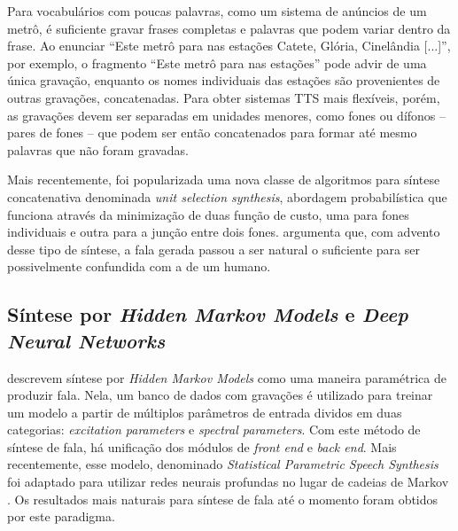 Para vocabulários com poucas palavras, como um sistema de anúncios de um metrô, é
suficiente gravar frases completas e palavras que podem variar dentro da frase.
Ao enunciar ``Este metrô para nas estações Catete, Glória, Cinelândia [...]'',
por exemplo, o fragmento ``Este metrô para nas estações'' pode advir de uma
única gravação, enquanto os nomes individuais das estações são provenientes de
outras gravações, concatenadas. Para obter sistemas TTS mais flexíveis, porém,
as gravações devem ser separadas em unidades menores, como fones ou dífonos --
 pares de fones -- que podem ser então concatenados para formar até mesmo
palavras que não foram gravadas.

Mais recentemente, foi popularizada uma nova classe de algoritmos para
síntese concatenativa denominada \emph{unit selection synthesis}, abordagem
probabilística que funciona através da minimização de duas função de custo, uma
para fones individuais e outra para a junção entre dois fones.
 argumenta que, com advento desse tipo de síntese, a fala
gerada passou a ser natural o suficiente para ser possivelmente confundida com a de um humano.

\subsection{Síntese por \emph{Hidden Markov Models} e \emph{Deep Neural Networks}}
\label{hmmsynthesis}
 descrevem síntese por \emph{Hidden Markov Models} como uma
maneira paramétrica de produzir fala. Nela, um banco de dados com gravações é
utilizado para treinar um modelo a partir de múltiplos parâmetros de entrada
dividos em duas categorias: \emph{excitation parameters} e
\emph{spectral parameters}. Com este método de síntese de fala, há unificação
dos módulos de \emph{front end} e \emph{back end}. Mais recentemente, esse
modelo, denominado \emph{Statistical Parametric Speech Synthesis} foi adaptado
para utilizar redes neurais profundas no lugar de cadeias de Markov
\cite{dnngoogle}. Os resultados mais naturais para síntese de fala até o momento
foram obtidos por este paradigma.


